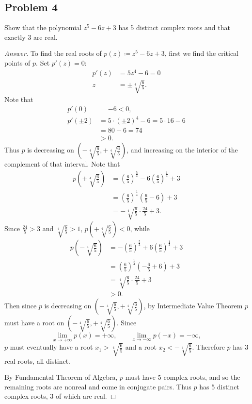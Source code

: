 \documentclass[12pt]{article}
\newcommand\paren[1]{\left( #1 \right)}
\theoremstyle{definition}
\begin{document}
\subsection{Problem 4 \texorpdfstring{\cite{Leon}}{}}
Show that the polynomial $z^5 - 6z + 3$ has 5 distinct complex roots and that exactly 3 are real.
\begin{proof}[Answer]
    To find the real roots of $p(z) \coloneqq z^5 - 6z + 3$, first we find the critical points of $p$. Set $p'(z) = 0$:
    \begin{align*}
        p'(z) & = 5z^4 - 6 = 0 \\
        z & = \pm \sqrt[4]{\frac{6}{5}}.
    \end{align*}
    Note that 
    \begin{align*}
        p'(0) & = -6 < 0, \\
        p'(\pm2) & = 5\cdot(\pm2)^4 - 6 = 5 \cdot 16 - 6 \\
        & = 80 - 6 = 74 \\ 
        & > 0.
    \end{align*}
    Thus $p$ is decreasing on $\paren{ -\sqrt[4]{\frac{6}{5}} , +\sqrt[4]{\frac{6}{5}} }$, and increasing on the interior of the complement of that interval. Note that
    \begin{align*}
        p \paren{ +\sqrt[4]{\frac{6}{5}} } & = \paren{ \frac{6}{5} }^{\frac{5}{4}} - 6 \paren{ \frac{6}{5} }^{\frac{1}{4}} + 3 \\
        & = \paren{ \frac{6}{5} }^{\frac{1}{4}} \paren{ \frac{6}{5} - 6 } + 3 \\
        & = -\sqrt[4]{\frac{6}{5}} \cdot \frac{24}{5} + 3.
    \end{align*}
    Since $\frac{24}{5} > 3$ and $\sqrt[4]{\frac{6}{5}} > 1$, $p \paren{ +\sqrt[4]{\frac{6}{5}} } < 0$, while
    \begin{align*}
        p \paren{ -\sqrt[4]{\frac{6}{5}} } & = -\paren{ \frac{6}{5} }^{\frac{5}{4}} + 6 \paren{ \frac{6}{5} }^{\frac{1}{4}} + 3 \\
        & = \paren{ \frac{6}{5} }^{\frac{1}{4}} \paren{ -\frac{6}{5} + 6 } + 3 \\
        & = \sqrt[4]{\frac{6}{5}} \cdot \frac{24}{5} + 3 \\
        & > 0.
    \end{align*}
    Then since $p$ is decreasing on $\paren{ -\sqrt[4]{\frac{6}{5}} , +\sqrt[4]{\frac{6}{5}} }$, by Intermediate Value Theorem $p$ must have a root on $\paren{ -\sqrt[4]{\frac{6}{5}} , +\sqrt[4]{\frac{6}{5}} }$. Since 
    \[
        \lim\limits_{x \to +\infty} p(x) = + \infty , \qquad \lim\limits_{x \to -\infty} p(-x) = - \infty ,
    \]
    $p$ must eventually have a root $x_1 > \sqrt[4]{\frac{6}{5}}$ and a root $x_2 < -\sqrt[4]{\frac{6}{5}}$. Therefore $p$ has 3 real roots, all distinct. 
    
    By Fundamental Theorem of Algebra, $p$ must have 5 complex roots, and so the remaining roots are nonreal and come in conjugate pairs. Thus $p$ has 5 distinct complex roots, 3 of which are real.
\end{proof}
\end{document}

